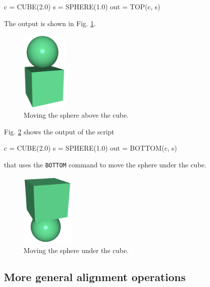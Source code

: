 \begin{bluecode}
c = CUBE(2.0)
s = SPHERE(1.0)
out = TOP(c, s)
\end{bluecode}
The output is shown in Fig. \ref{fig:top-1}.
\newpage

\begin{figure}[!ht]
\begin{center}
\includegraphics[width=0.2\textwidth]{img/top-1.png}
\end{center}
\vspace{-4mm}
\caption{Moving the sphere above the cube.}
\label{fig:top-1}
\end{figure}
\noindent
Fig. \ref{fig:bottom-1} shows the output of the script

\begin{bluecode}
c = CUBE(2.0)
s = SPHERE(1.0)
out = BOTTOM(c, s)
\end{bluecode}
that uses the {\tt BOTTOM} command to move the sphere 
under the cube.

\begin{figure}[!ht]
\begin{center}
\includegraphics[width=0.23\textwidth]{img/bottom-1.png}
\end{center}
\vspace{-4mm}
\caption{Moving the sphere under the cube.}
\label{fig:bottom-1}
\end{figure}
\noindent

\subsection{More general alignment operations}

